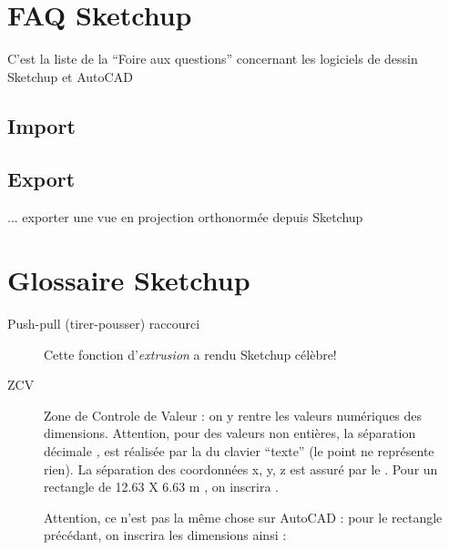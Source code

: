 \documentclass[a4paper,12pt,french]{sphinxmanual}
\begin{document}
\section{FAQ Sketchup}
\label{su/faq_su:faq-sketchup}\label{su/faq_su::doc}\label{su/faq_su:faq-su}
C'est la liste de la ``Foire aux questions'' concernant les logiciels de dessin Sketchup et AutoCAD


\subsection{Import}
\label{su/faq_su:import}

\subsection{Export}
\label{su/faq_su:export}\begin{description}
\item[{... exporter une vue en projection orthonormée depuis Sketchup}] \leavevmode
{}

\end{description}


\section{Glossaire Sketchup}
\label{su/glossaire_su:glossaire-su}\label{su/glossaire_su::doc}\label{su/glossaire_su:glossaire-sketchup}\begin{description}
\item[{Push-pull (tirer-pousser) raccourci}] \leavevmode{}\label{su/glossaire_su:term-push-pull-tirer-pousser-raccourci}
Cette fonction d'\emph{extrusion} a rendu Sketchup célèbre!

\item[{ZCV}] \leavevmode{}\label{su/glossaire_su:term-zcv}
Zone de Controle de Valeur : on y rentre les valeurs numériques des dimensions. Attention, pour des valeurs non entières, la séparation décimale \emph{,} est réalisée par la \sphinxcode{,} du clavier ``texte'' (le point ne représente rien). La séparation des coordonnées x, y, z est assuré par le \sphinxcode{;} . Pour un rectangle de 12.63 X 6.63 m , on inscrira  .

Attention, ce n'est pas la même chose sur AutoCAD : pour le rectangle précédant, on inscrira les dimensions ainsi : 

\end{description}
\end{document}
